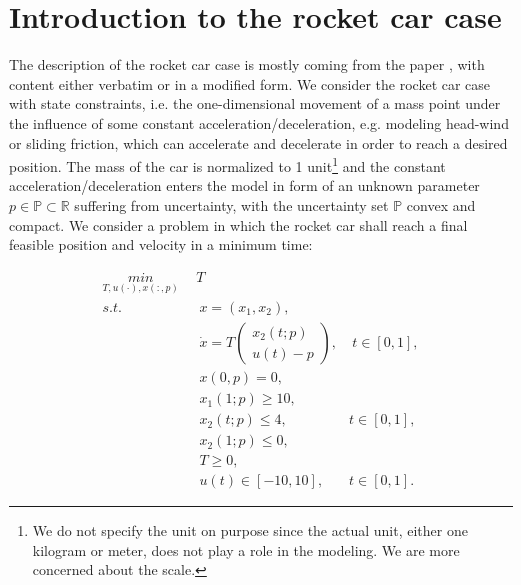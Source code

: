 \documentclass  [
  paper    = a4,
  BCOR     = 10mm,
  twoside,
  fontsize = 12pt,
  fleqn,
  toc      = bibnumbered,
  toc      = listofnumbered,
  numbers  = noendperiod,
  headings = normal,
  listof   = leveldown,
  version  = 3.03
]                                       {scrreprt}
\newcommand{\<}{\langle}
\renewcommand{\>}{\rangle}
\begin{document}
\section{Introduction to the rocket car case}

The description of the rocket car case is mostly coming from the paper \cite{MatSch22}, with content either verbatim or in a modified form. We consider the rocket car case with state constraints, i.e. the one-dimensional movement of a mass point under the influence of some constant acceleration/deceleration, e.g. modeling head-wind or sliding friction, which can accelerate and decelerate in order to reach a desired position. The mass of the car is normalized to 1 unit\footnote{We do not specify the unit on purpose since the actual unit, either one kilogram or meter, does not play a role in the modeling. We are more concerned about the scale.} and the constant acceleration/deceleration enters the model in form of an unknown parameter $p \in  \mathbb{P} \subset \mathbb{R}$ suffering from uncertainty, with the uncertainty set $ \mathbb{P}$ convex and compact. We consider a problem in which the rocket car shall reach a final feasible position and velocity in a minimum time: 



\begin{subequations}
	\begin{align}
		\underset{T, u(\cdot), x(:,p)}{min} \   & \  T \\ 
		s.t.  & \ \ x = (x_1, x_2),   \label{rc_x} \\ 
		& \ \  \dot{x} = T  \begin{pmatrix}  x_2(t;p) \\ u(t)-p   \end{pmatrix}, & \ t \in [0,1],  \label{rc_partial} \\
		& \ \ x(0,p) = 0, \label{rc_t0}\\
		& \ \ x_1(1;p) \geq 10, \label{rc_x1_t1} \\
		& \ \ x_2(t;p) \leq 4, & t \in [0,1], \label{rc_x2_tc} \\
		& \ \ x_2(1;p) \leq 0, \label{rc_x2_T}  \\
		& \ \ T \geq 0, \\
		& \ \ u(t) \in [-10, 10], & t \in [0,1]. 
	\end{align}
	\label{rc}
\end{subequations}
\end{document}
